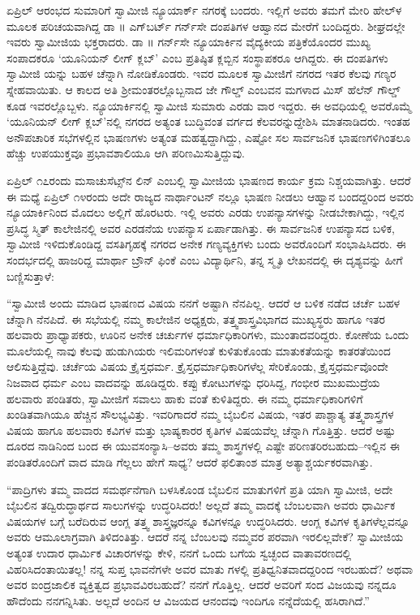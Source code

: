 ಏಪ್ರಿಲ್ ಆರಂಭದ ಸುಮಾರಿಗೆ ಸ್ವಾಮೀಜಿ ನ್ಯೂಯಾರ್ಕ್ ನಗರಕ್ಕೆ ಬಂದರು. ಇಲ್ಲಿಗೆ ಅವರು ತಮಗೆ ಮೇರಿ ಹೇಲ್​ಳ ಮೂಲಕ ಪರಿಚಯವಾಗಿದ್ದ ಡಾ ॥ ಎಗ್​ಬರ್ಟ್ ಗರ್ನ್​ಸೇ ದಂಪತಿಗಳ ಆಹ್ವಾನದ ಮೇರೆಗೆ ಬಂದಿದ್ದರು. ಶೀಘ್ರದಲ್ಲೇ ಇವರು ಸ್ವಾಮೀಜಿಯ ಭಕ್ತರಾದರು. ಡಾ ॥ ಗರ್ನ್​ಸೇ ನ್ಯೂಯಾರ್ಕಿನ ವೈದ್ಯಕೀಯ ಪತ್ರಿಕೆಯೊಂದರ ಮುಖ್ಯ ಸಂಪಾದಕರೂ ‘ಯೂನಿಯನ್ ಲೀಗ್ ಕ್ಲಬ್​’ ಎಂಬ ಪ್ರತಿಷ್ಠಿತ ಕ್ಲಬ್ಬಿನ ಸಂಸ್ಥಾಪಕರೂ ಆಗಿದ್ದರು. ಈ ದಂಪತಿಗಳು ಸ್ವಾಮೀಜಿ ಯನ್ನು ಬಹಳ ಚೆನ್ನಾಗಿ ನೋಡಿಕೊಂಡರು. ಇವರ ಮೂಲಕ ಸ್ವಾಮೀಜಿಗೆ ನಗರದ ಇತರ ಕೆಲವು ಗಣ್ಯರ ಸ್ನೇಹವಾಯಿತು. ಆ ಕಾಲದ ಅತಿ ಶ್ರೀಮಂತರಲ್ಲೊಬ್ಬನಾದ ಜೇ ಗೌಲ್ಡ್ ಎಂಬವನ ಮಗಳಾದ ಮಿಸ್ ಹೆಲೆನ್ ಗೌಲ್ಡ್ ಕೂಡ ಇವರಲ್ಲೊಬ್ಬಳು. ನ್ಯೂಯಾರ್ಕಿನಲ್ಲಿ ಸ್ವಾಮೀಜಿ ಸುಮಾರು ಎರಡು ವಾರ ಇದ್ದರು. ಈ ಅವಧಿಯಲ್ಲಿ ಅವರೊಮ್ಮೆ ‘ಯೂನಿಯನ್ ಲೀಗ್ ಕ್ಲಬ್​’ನಲ್ಲಿ ನಗರದ ಅತ್ಯಂತ ಬುದ್ಧಿವಂತ ವರ್ಗದ ಕೆಲವರನ್ನುದ್ದೇಶಿಸಿ ಮಾತನಾಡಿದರು. ಇಂತಹ ಅನೌಪಚಾರಿಕ ಸಭೆಗಳಲ್ಲಿನ ಭಾಷಣಗಳು ಅತ್ಯಂತ ಮಹತ್ವದ್ದಾಗಿದ್ದು, ಎಷ್ಟೋ ಸಲ ಸಾರ್ವಜನಿಕ ಭಾಷಣಗಳಿಗಿಂತಲೂ ಹೆಚ್ಚು ಉಪಯುಕ್ತವೂ ಪ್ರಭಾವಶಾಲಿಯೂ ಆಗಿ ಪರಿಣಮಿಸುತ್ತಿದ್ದುವು.

ಏಪ್ರಿಲ್ ೧೭ರಂದು ಮಸಾಚುಸೆಟ್ಸ್​ನ ಲಿನ್ ಎಂಬಲ್ಲಿ ಸ್ವಾಮೀಜಿಯ ಭಾಷಣದ ಕಾರ್ಯ ಕ್ರಮ ನಿಶ್ಚಯವಾಗಿತ್ತು. ಆದರೆ ಈ ಮಧ್ಯೆ ಏಪ್ರಿಲ್ ೧೪ರಂದು ಅದೇ ರಾಜ್ಯದ ನಾರ್ಥಾಂಟನ್ ನಲ್ಲೂ ಭಾಷಣ ನೀಡಲು ಆಹ್ವಾನ ಬಂದದ್ದರಿಂದ ಅವರು ನ್ಯೂಯಾರ್ಕಿನಿಂದ ಮೊದಲು ಅಲ್ಲಿಗೆ ಹೊರಟರು. ಇಲ್ಲಿ ಅವರು ಎರಡು ಉಪನ್ಯಾಸಗಳನ್ನು ನೀಡಬೇಕಾಗಿದ್ದು, ಇಲ್ಲಿನ ಪ್ರಸಿದ್ಧ ಸ್ಮಿತ್ ಕಾಲೇಜಿನಲ್ಲಿ ಅವರ ಎರಡನೆಯ ಉಪನ್ಯಾಸ ಏರ್ಪಾಡಾಗಿತ್ತು. ಈ ಸಾರ್ವಜನಿಕ ಉಪನ್ಯಾಸದ ಬಳಿಕ, ಸ್ವಾಮೀಜಿ ಇಳಿದುಕೊಂಡಿದ್ದ ವಸತಿಗೃಹಕ್ಕೆ ನಗರದ ಅನೇಕ ಗಣ್ಯವ್ಯಕ್ತಿಗಳು ಬಂದು ಅವರೊಂದಿಗೆ ಸಂಭಾಷಿಸಿದರು. ಈ ಸಂದರ್ಭದಲ್ಲಿ ಹಾಜರಿದ್ದ ಮಾರ್ಥಾ ಬ್ರೌನ್ ಫಿಂಕೆ ಎಂಬ ವಿದ್ಯಾರ್ಥಿನಿ, ತನ್ನ ಸ್ಮೃತಿ ಲೇಖನದಲ್ಲಿ ಈ ದೃಶ್ಯವನ್ನು ಹೀಗೆ ಬಣ್ಣಿಸುತ್ತಾಳೆ:

“ಸ್ವಾಮೀಜಿ ಅಂದು ಮಾಡಿದ ಭಾಷಣದ ವಿಷಯ ನನಗೆ ಅಷ್ಟಾಗಿ ನೆನಪಿಲ್ಲ. ಆದರೆ ಆ ಬಳಿಕ ನಡೆದ ಚರ್ಚೆ ಬಹಳ ಚೆನ್ನಾಗಿ ನೆನಪಿದೆ. ಈ ಸಭೆಯಲ್ಲಿ ನಮ್ಮ ಕಾಲೇಜಿನ ಅಧ್ಯಕ್ಷರು, ತತ್ತ್ವಶಾಸ್ತ್ರವಿಭಾಗದ ಮುಖ್ಯಸ್ಥರು ಹಾಗೂ ಇತರ ಹಲವಾರು ಪ್ರಾಧ್ಯಾಪಕರು, ಊರಿನ ಅನೇಕ ಚರ್ಚುಗಳ ಧರ್ಮಾಧಿಕಾರಿಗಳು, ಮುಂತಾದವರಿದ್ದರು. ಕೋಣೆಯ ಒಂದು ಮೂಲೆಯಲ್ಲಿ ನಾವು ಕೆಲವು ಹುಡುಗಿಯರು ಇಲಿಮರಿಗಳಂತೆ ಕುಳಿತುಕೊಂಡು ಮಾತುಕತೆಯನ್ನು ಕಾತರತೆಯಿಂದ ಆಲಿಸುತ್ತಿದ್ದೆವು. ಚರ್ಚೆಯ ವಿಷಯ ಕ್ರೈಸ್ತಧರ್ಮ. ಕ್ರೈಸ್ತಧರ್ಮಾಧಿಕಾರಿಗಳೆಲ್ಲ ಸೇರಿಕೊಂಡು, ಕ್ರೈಸ್ತಧರ್ಮವೊಂದೇ ನಿಜವಾದ ಧರ್ಮ ಎಂಬ ವಾದವನ್ನು ಹೂಡಿದ್ದರು. ಕಪ್ಪು ಕೋಟುಗಳನ್ನು ಧರಿಸಿದ್ದ, ಗಂಭೀರ ಮುಖಮುದ್ರೆಯ ಹಲವಾರು ಪಂಡಿತರು, ಸ್ವಾಮೀಜಿಗೆ ಸವಾಲು ಹಾಕು ವಂತೆ ಕುಳಿತಿದ್ದರು. ಈ ನಮ್ಮ ಧರ್ಮಾಧಿಕಾರಿಗಳಿಗೆ ಖಂಡಿತವಾಗಿಯೂ ಹೆಚ್ಚಿನ ಸೌಲಭ್ಯವಿತ್ತು. ಇವರಿಗಾದರೆ ನಮ್ಮ ಬೈಬಲಿನ ವಿಷಯ, ಇತರ ಪಾಶ್ಚಾತ್ಯ ತತ್ತ್ವಶಾಸ್ತ್ರಗಳ ವಿಷಯ ಹಾಗೂ ಹಲವಾರು ಕವಿಗಳ ಮತ್ತು ಭಾಷ್ಯಕಾರರ ಕೃತಿಗಳ ವಿಷಯವೆಲ್ಲ ಚೆನ್ನಾಗಿ ಗೊತ್ತಿತ್ತು. ಆದರೆ ಅಷ್ಟು ದೂರದ ನಾಡಿನಿಂದ ಬಂದ ಈ ಯುವಸಂನ್ಯಾಸಿ–ಅವರು ತಮ್ಮ ಶಾಸ್ತ್ರಗಳಲ್ಲಿ ಎಷ್ಟೇ ಪರಿಣತರಿರಬಹುದು–ಇಲ್ಲಿನ ಈ ಪಂಡಿತರೊಂದಿಗೆ ವಾದ ಮಾಡಿ ಗೆಲ್ಲಲು ಹೇಗೆ ಸಾಧ್ಯ? ಆದರೆ ಫಲಿತಾಂಶ ಮಾತ್ರ ಅತ್ಯಾಶ್ಚರ್ಯಕರವಾಗಿತ್ತು.

“ಪಾದ್ರಿಗಳು ತಮ್ಮ ವಾದದ ಸಮರ್ಥನೆಗಾಗಿ ಬಳಸಿಕೊಂಡ ಬೈಬಲಿನ ಮಾತುಗಳಿಗೆ ಪ್ರತಿ ಯಾಗಿ ಸ್ವಾಮೀಜಿ, ಅದೇ ಬೈಬಲಿನ ತದ್ವಿರುದ್ಧಾರ್ಥದ ಸಾಲುಗಳನ್ನು ಉದ್ಧರಿಸಿದರು! ಅಲ್ಲದೆ ತಮ್ಮ ವಾದಕ್ಕೆ ಬೆಂಬಲವಾಗಿ ಅವರು ಧಾರ್ಮಿಕ ವಿಷಯಗಳ ಬಗ್ಗೆ ಬರೆದಿರುವ ಆಂಗ್ಲ ತತ್ತ್ವ ಶಾಸ್ತ್ರಜ್ಞರನ್ನೂ ಕವಿಗಳನ್ನೂ ಉದ್ಧರಿಸಿದರು. ಆಂಗ್ಲ ಕವಿಗಳ ಕೃತಿಗಳೆಲ್ಲವನ್ನೂ ಅವರು ಆಮೂಲಾಗ್ರವಾಗಿ ತಿಳಿದಂತಿತ್ತು. ಆದರೆ ನನ್ನ ಬೆಂಬಲವು ನಮ್ಮವರ ಪರವಾಗಿ ಇರಲಿಲ್ಲವೇಕೆ? ಸ್ವಾಮೀಜಿಯ ಅತ್ಯಂತ ಉದಾರ ಧಾರ್ಮಿಕ ವಿಚಾರಗಳನ್ನು ಕೇಳಿ, ನನಗೆ ಒಂದು ಬಗೆಯ ಸ್ವಚ್ಛಂದ ವಾತಾವರಣದಲ್ಲಿ ವಿಹರಿಸಿದಂತಾಯಿತಲ್ಲ! ನನ್ನ ಸುಪ್ತ ಭಾವನೆಗಳೇ ಅವರ ಮಾತು ಗಳಲ್ಲಿ ಪ್ರತಿಧ್ವನಿತವಾದದ್ದರಿಂದ ಇರಬಹುದೆ? ಅಥವಾ ಅವರ ಐಂದ್ರಜಾಲಿಕ ವ್ಯಕ್ತಿತ್ವದ ಪ್ರಭಾವವಿರಬಹುದೆ? ನನಗೆ ಗೊತ್ತಿಲ್ಲ. ಆದರೆ ಅವರಿಗೆ ಸಂದ ವಿಜಯವು ನನ್ನದೂ ಹೌದೆಂದು ನನಗನ್ನಿಸಿತು. ಅಲ್ಲದೆ ಅಂದಿನ ಆ ವಿಜಯದ ಆನಂದವು ಇಂದಿಗೂ ನನ್ನೆದೆಯಲ್ಲಿ ಹಸಿರಾಗಿದೆ.”

